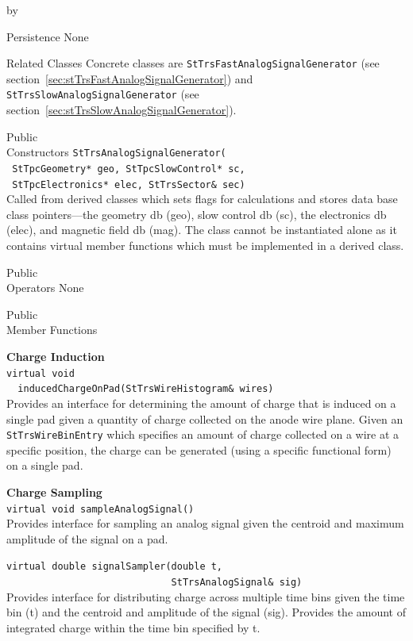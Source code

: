 \documentclass[twoside]{article}
\newcommand{\comp}[1]{\texttt{#1}}%
\newcommand{\entrylabel}[1]{\mbox{\textbf{{#1}}}\hfil}%
\newenvironment{entry}
{\begin{list}{}%
    {\renewcommand{\makelabel}{\entrylabel}%
     \setlength{\labelwidth}{90pt}%
     \setlength{\leftmargin}{\labelwidth}
     \advance\leftmargin by \labelsep%
      }%
    }%
  {\end{list}}
\newcommand{\Entrylabel}[1]%
{\raisebox{0pt}[1ex][0pt]{\makebox[\labelwidth][l]%
    {\parbox[t]{\labelwidth}{\hspace{0pt}\textbf{{#1}}}}}}
\newenvironment{Entry}%
{\renewcommand{\entrylabel}{\Entrylabel}\begin{entry}}%
  {\end{entry}}
\begin{document}
\begin{Entry}
\item[Persistence]
   None

\item[Related Classes]
   Concrete  classes are \comp{StTrsFastAnalogSignalGenerator} (see 
   section~\ref{sec:stTrsFastAnalogSignalGenerator}) and
   \comp{StTrsSlowAnalogSignalGenerator} (see 
   section~\ref{sec:stTrsSlowAnalogSignalGenerator}).  

\item[Public \\ Constructors]
   \verb+StTrsAnalogSignalGenerator(+\\
   \verb+ StTpcGeometry* geo, StTpcSlowControl* sc,+\\
   \verb+ StTpcElectronics* elec, StTrsSector& sec)+\\
   Called from derived classes which sets flags for calculations and
   stores data base class pointers---the geometry db (geo), 
   slow control db (sc), the electronics db (elec), and magnetic field 
   db (mag).
   The class cannot be instantiated alone as it contains virtual 
   member functions which must be implemented
   in a derived class.

\item[Public \\ Operators]
   None

\item[Public \\ Member Functions]

  {\bf Charge Induction \\}
  \verb+virtual void+\\
  \verb+  inducedChargeOnPad(StTrsWireHistogram& wires)+\\
  Provides an interface for determining the amount of charge that is induced
  on a single pad given a quantity of charge collected on the anode
  wire plane.  Given an \comp{StTrsWireBinEntry} which specifies an amount
  of charge collected on a wire at a specific position, the charge can
  be generated (using a specific functional form) on a single pad.
  
  {\bf Charge Sampling \\}
  \verb+virtual void sampleAnalogSignal()+\\
  Provides interface for sampling an analog signal given the centroid and
  maximum amplitude of the signal on a pad.

  \verb+virtual double signalSampler(double t,+\\
  \verb+                             StTrsAnalogSignal& sig)+\\
  Provides interface for distributing charge across multiple time bins
  given the time bin (t) and the centroid and amplitude of the signal (sig).
  Provides the amount of integrated charge within the time bin specified
  by t.


\end{Entry}
\end{document}
